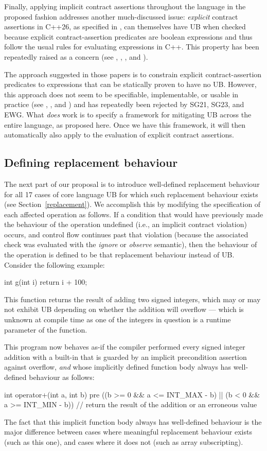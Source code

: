 {Finally, applying implicit contract assertions throughout the language in the proposed fashion addresses another much-discussed issue: \emph{explicit} contract assertions in C++26, as specified in \cite{P2900R14}, can themselves have UB when checked because explicit contract-assertion predicates are boolean expressions and thus follow the usual rules for evaluating expressions in C++. This property has been repeatedly raised as a concern (see \cite{P2680R1}, \cite{P3173R0}, \cite{P3285R0}, and \cite{P3362R0}).

The approach suggested in those papers is to constrain explicit contract-assertion predicates to expressions that can be statically proven to have no UB. However, this approach does not seem to be specifiable, implementable, or usable in practice (see  \cite{P3376R0}, \cite{P3386R0}, and \cite{P3499R1}) and has repeatedly been rejected by SG21, SG23, and EWG. What \emph{does} work is to specify a framework for mitigating UB across the entire language, as proposed here. Once we have this framework, it will then automatically also apply to the evaluation of explicit contract assertions.

\subsection{Defining replacement behaviour}
\label{specifyeb}
The next part of our proposal is to introduce well-defined replacement behaviour for all 17 cases of core language UB for which such replacement behaviour exists (see Section~\ref{replacement}). We accomplish this by modifying the specification of each affected operation as follows. If a condition that would have previously made the behaviour of the operation undefined (i.e., an implicit contract violation) occurs, and control flow continues past that violation (because the associated check was evaluated with the \emph{ignore} or \emph{observe} semantic), then the behaviour of the operation is defined to be that replacement behaviour instead of UB. Consider the following example:
\begin{codeblock}
int g(int i) {
  return i + 100;
}
\end{codeblock}
This function returns the result of adding two signed integers, which may or may not exhibit UB depending on whether the addition will overflow --- which is unknown at compile time as one of the integers in question is a runtime parameter of the function.

This program now behaves as-if the compiler performed every signed integer addition with a built-in  that is guarded by an implicit precondition assertion against overflow, \emph{and} whose implicitly defined function body always has well-defined behaviour as follows:
\begin{codeblock}
int operator+(int a, int b)
pre ((b >= 0 && a <= INT_MAX - b) || (b < 0 && a >= INT_MIN - b)) {  
  // return the result of the addition or an erroneous value
}
\end{codeblock}
The fact that this implicit function body always has well-defined behaviour is the major difference between cases where meaningful replacement behaviour exists (such as this one), and cases where it does not (such as array subscripting).

}
